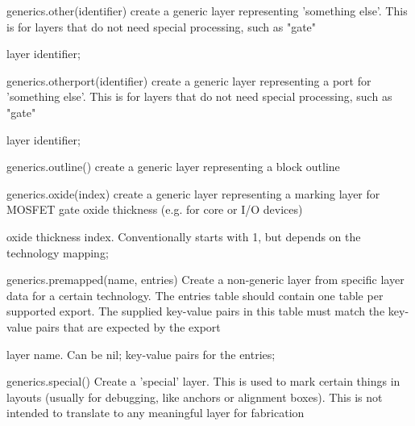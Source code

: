 \begin{APIfunc}{generics.other(identifier)}
    create a generic layer representing 'something else'. This is for layers that do not need special processing, such as "gate"
    \begin{APIparameters}
            layer identifier;
    \end{APIparameters}
\end{APIfunc}
\begin{APIfunc}{generics.otherport(identifier)}
    create a generic layer representing a port for 'something else'. This is for layers that do not need special processing, such as "gate"
    \begin{APIparameters}
            layer identifier;
    \end{APIparameters}
\end{APIfunc}
\begin{APIfunc}{generics.outline()}
    create a generic layer representing a block outline
    \begin{APIparameters}
    \end{APIparameters}
\end{APIfunc}
\begin{APIfunc}{generics.oxide(index)}
    create a generic layer representing a marking layer for MOSFET gate oxide thickness (e.g. for core or I/O devices)
    \begin{APIparameters}
            oxide thickness index. Conventionally starts with 1, but depends on the technology mapping;
    \end{APIparameters}
\end{APIfunc}
\begin{APIfunc}{generics.premapped(name, entries)}
    Create a non-generic layer from specific layer data for a certain technology. The entries table should contain one table per supported export. The supplied key-value pairs in this table must match the key-value pairs that are expected by the export
    \begin{APIparameters}
            layer name. Can be nil;
            key-value pairs for the entries;
    \end{APIparameters}
\end{APIfunc}
\begin{APIfunc}{generics.special()}
    Create a 'special' layer. This is used to mark certain things in layouts (usually for debugging, like anchors or alignment boxes). This is not intended to translate to any meaningful layer for fabrication
    \begin{APIparameters}
    \end{APIparameters}
\end{APIfunc}
